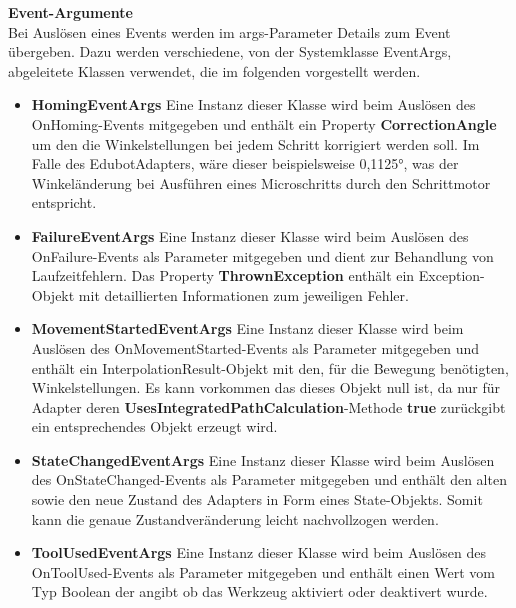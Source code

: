 \textbf{Event-Argumente}\\
Bei Auslösen eines Events werden im args-Parameter Details zum Event übergeben. Dazu werden verschiedene, von der Systemklasse EventArgs, abgeleitete Klassen verwendet, die im folgenden vorgestellt werden.
\begin{itemize}
\item \textbf{HomingEventArgs}
Eine Instanz dieser Klasse wird beim Auslösen des OnHoming-Events mitgegeben und enthält ein Property \textbf{CorrectionAngle} um den die Winkelstellungen bei jedem Schritt korrigiert werden soll. Im Falle des EdubotAdapters, wäre dieser beispielsweise 0,1125°, was der Winkeländerung bei Ausführen eines Microschritts durch den Schrittmotor entspricht.
\item \textbf{FailureEventArgs}
Eine Instanz dieser Klasse wird beim Auslösen des OnFailure-Events als Parameter mitgegeben und dient zur Behandlung von Laufzeitfehlern. Das Property \textbf{ThrownException} enthält ein Exception-Objekt mit detaillierten Informationen zum jeweiligen Fehler. \\
\item \textbf{MovementStartedEventArgs}
Eine Instanz dieser Klasse wird beim Auslösen des OnMovementStarted-Events als Parameter mitgegeben und enthält ein InterpolationResult-Objekt mit den, für die Bewegung benötigten, Winkelstellungen. Es kann vorkommen das dieses Objekt null ist, da nur für Adapter deren \textbf{UsesIntegratedPathCalculation}-Methode \textbf{true} zurückgibt ein entsprechendes Objekt erzeugt wird. \\
\item \textbf{StateChangedEventArgs}
Eine Instanz dieser Klasse wird beim Auslösen des OnStateChanged-Events als Parameter mitgegeben und enthält den alten sowie den neue Zustand des Adapters in Form eines State-Objekts. Somit kann die genaue Zustandveränderung leicht nachvollzogen werden.\\
\item \textbf{ToolUsedEventArgs}
Eine Instanz dieser Klasse wird beim Auslösen des OnToolUsed-Events als Parameter mitgegeben und enthält einen Wert vom Typ Boolean der angibt ob das Werkzeug aktiviert oder deaktivert wurde.\\
\end{itemize}
